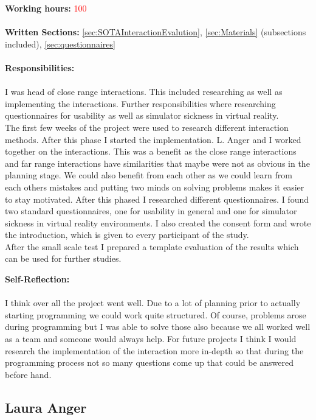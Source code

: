 \textbf{Working hours:} \textcolor{red}{100} \\ \\
\textbf{Written Sections:} \ref{sec:SOTAInteractionEvalution}, \ref{sec:Materials} (subsections included), \ref{sec:questionnaires} \\ \\
\textbf{Responsibilities:}\\ \\
I was head of close range interactions. This included researching as well as implementing the interactions. Further responsibilities where researching questionnaires for usability as well as simulator sickness in virtual reality. \\
The first few weeks of the project were used to research different interaction methods. After this phase I started the implementation. L. Anger and I worked together on the interactions. This was a benefit as the close range interactions and far range interactions have similarities that maybe were not as obvious in the planning stage. We could also benefit from each other as we could learn from each others mistakes and putting two minds on solving problems makes it easier to stay motivated. 
After this phased I researched different questionnaires. I found two standard questionnaires, one for usability in general and one for simulator sickness in virtual reality environments. I also created the consent form and wrote the introduction, which is given to every participant of the study. \\
After the small scale test I prepared a template evaluation of the results which can be used for further studies. 

\textbf{Self-Reflection:}\\ \\
I think over all the project went well. Due to a lot of planning prior to actually starting programming we could work quite structured. Of course, problems arose during programming but I was able to solve those also because we all worked well as a team and someone would always help. For future projects I think I would research the implementation of the interaction more in-depth so that during the programming process not so many questions come up that could be answered before hand.  \\
\newpage
\subsection{Laura Anger} \label{sec:SALaura}

